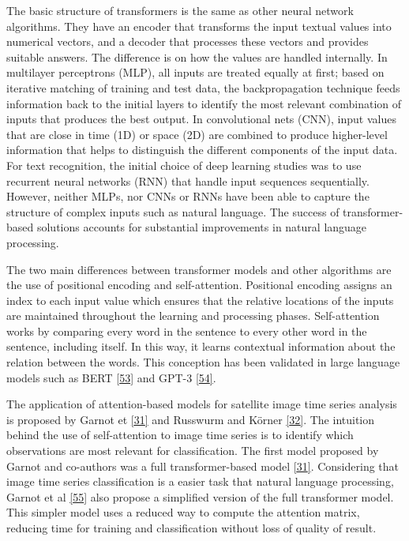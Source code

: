 \documentclass[
  11pt,
]{report}
\begin{document}
The basic structure of transformers is the same as other neural network
algorithms. They have an encoder that transforms the input textual
values into numerical vectors, and a decoder that processes these
vectors and provides suitable answers. The difference is on how the
values are handled internally. In multilayer perceptrons (MLP), all
inputs are treated equally at first; based on iterative matching of
training and test data, the backpropagation technique feeds information
back to the initial layers to identify the most relevant combination of
inputs that produces the best output. In convolutional nets (CNN), input
values that are close in time (1D) or space (2D) are combined to produce
higher-level information that helps to distinguish the different
components of the input data. For text recognition, the initial choice
of deep learning studies was to use recurrent neural networks (RNN) that
handle input sequences sequentially. However, neither MLPs, nor CNNs or
RNNs have been able to capture the structure of complex inputs such as
natural language. The success of transformer-based solutions accounts
for substantial improvements in natural language processing.

The two main differences between transformer models and other algorithms
are the use of positional encoding and self-attention. Positional
encoding assigns an index to each input value which ensures that the
relative locations of the inputs are maintained throughout the learning
and processing phases. Self-attention works by comparing every word in
the sentence to every other word in the sentence, including itself. In
this way, it learns contextual information about the relation between
the words. This conception has been validated in large language models
such as BERT \protect\hyperlink{ref-Devlin2019}{{[}53{]}} and GPT-3
\protect\hyperlink{ref-Brown2020}{{[}54{]}}.

The application of attention-based models for satellite image time
series analysis is proposed by Garnot et
\protect\hyperlink{ref-Garnot2020a}{{[}31{]}} and Russwurm and Körner
\protect\hyperlink{ref-Russwurm2020}{{[}32{]}}. The intuition behind the
use of self-attention to image time series is to identify which
observations are most relevant for classification. The first model
proposed by Garnot and co-authors was a full transformer-based model
\protect\hyperlink{ref-Garnot2020a}{{[}31{]}}. Considering that image
time series classification is a easier task that natural language
processing, Garnot et al \protect\hyperlink{ref-Garnot2020b}{{[}55{]}}
also propose a simplified version of the full transformer model. This
simpler model uses a reduced way to compute the attention matrix,
reducing time for training and classification without loss of quality of
result.
\end{document}
